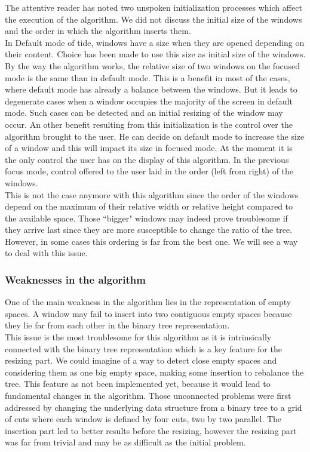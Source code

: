 \documentclass{acmtog}
\begin{document}
The attentive reader has noted two unspoken initialization processes which affect the execution of the algorithm. We did not discuss the initial size of the windows and the order in which the algorithm inserts them. \\
In Default mode of tide, windows have a size when they are opened depending on their content. Choice has been made to use this size as initial size of the windows. By the way the algorithm works, the relative size of two windows on the focused mode is the same than in default mode. This is a benefit in most of the cases, where default mode has already a balance between the windows. But it leads to degenerate cases when a window occupies the majority of the screen in default mode. Such cases can be detected and an initial resizing of the window may occur. An other benefit resulting from this initialization is the control over the algorithm brought to the user. He can decide on default mode to increase the size of a window and this will impact its size in focused mode. At the moment it is the only control the user has on the display of this algorithm. In the previous focus mode, control offered to the user laid in the order (left from right) of the windows. \\
This is not the case anymore with this algorithm since the order of the windows depend on the maximum of their relative width or relative height compared to the available space. Those ``bigger" windows may indeed prove troublesome if they arrive last since they are more susceptible to change the ratio of the tree. However, in some cases this ordering is far from the best one. We will see a way to deal with this issue.

\subsubsection{Weaknesses in the algorithm}

One of the main weakness in the algorithm lies in the representation of empty spaces. A window may fail to insert into two contiguous empty spaces because they lie far from each other in the binary tree representation. \\
This issue is the most troublesome for this algorithm as it is intrinsically connected with the binary tree representation which is a key feature for the resizing part. We could imagine of a way to detect close empty spaces and considering them as one big empty space, making some insertion to rebalance the tree. This feature as not been implemented yet, because it would lead to fundamental changes in the algorithm. Those unconnected problems were first addressed by changing the underlying data structure from a binary tree to a grid of cuts where each window is defined by four cuts, two by two parallel. The insertion part led to better results before the resizing, however the resizing part was far from trivial and may be as difficult as the initial problem.
\end{document}
